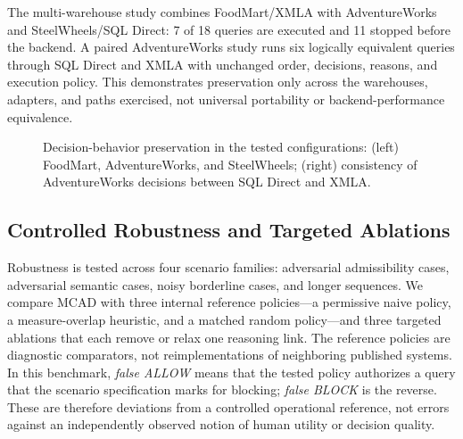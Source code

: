 \documentclass[journal]{IEEEtran}
\begin{document}
The multi-warehouse study combines FoodMart/XMLA with AdventureWorks and SteelWheels/SQL Direct: 7 of 18 queries are executed and 11 stopped before the backend. A paired AdventureWorks study runs six logically equivalent queries through SQL Direct and XMLA with unchanged order, decisions, reasons, and execution policy. This demonstrates preservation only across the warehouses, adapters, and paths exercised, not universal portability or backend-performance equivalence.

\begin{figure}[!t]
\centering
\begin{minipage}[t]{0.49\textwidth}\centering\end{minipage}\hfill
\begin{minipage}[t]{0.49\textwidth}\centering\end{minipage}
\caption{Decision-behavior preservation in the tested configurations: (left) FoodMart, AdventureWorks, and SteelWheels; (right) consistency of AdventureWorks decisions between SQL Direct and XMLA.}
\label{fig:portability}
\end{figure}

\subsection{Controlled Robustness and Targeted Ablations}

Robustness is tested across four scenario families: adversarial admissibility cases, adversarial semantic cases, noisy borderline cases, and longer sequences. We compare MCAD with three internal reference policies---a permissive naive policy, a measure-overlap heuristic, and a matched random policy---and three targeted ablations that each remove or relax one reasoning link. The reference policies are diagnostic comparators, not reimplementations of neighboring published systems. In this benchmark, \emph{false ALLOW} means that the tested policy authorizes a query that the scenario specification marks for blocking; \emph{false BLOCK} is the reverse. These are therefore deviations from a controlled operational reference, not errors against an independently observed notion of human utility or decision quality.


\end{document}
